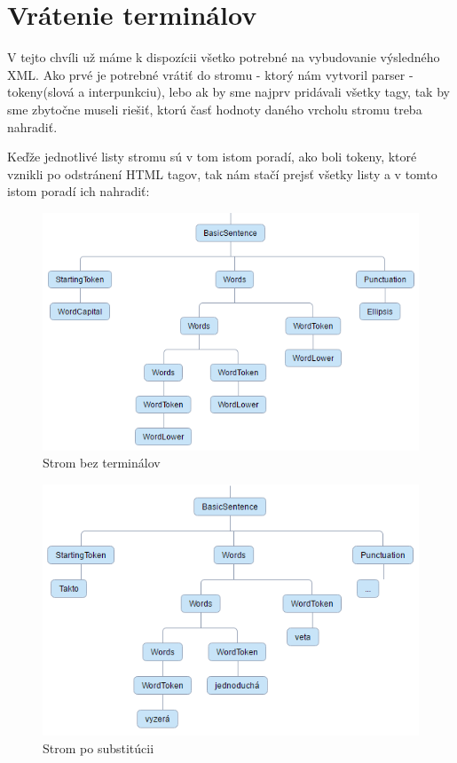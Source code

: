 \documentclass[12pt,a4paper]{report}
\theoremstyle{definition}
\theoremstyle{remark}
\begin{document}
\section{Vrátenie terminálov}

V tejto chvíli už máme k dispozícii všetko potrebné na vybudovanie výsledného XML. Ako prvé je potrebné vrátiť do stromu - ktorý nám vytvoril parser - tokeny(slová a interpunkciu), lebo ak by sme najprv pridávali všetky tagy, tak by sme zbytočne museli riešiť, ktorú časť hodnoty daného vrcholu stromu treba nahradiť.

Keďže jednotlivé listy stromu sú v tom istom poradí, ako boli tokeny, ktoré vznikli po odstránení HTML tagov, tak nám stačí prejsť všetky listy a v tomto istom poradí ich nahradiť:


\begin{figure}[h]
\centering
\includegraphics[scale=2.6]{treeBeforeSubstitution}
\caption{Strom bez terminálov}
\end{figure}

\begin{figure}[H]
\includegraphics[scale=2.4]{treeAfterSubstitution}
\caption{Strom po substitúcii}
\end{figure}
\end{document}
